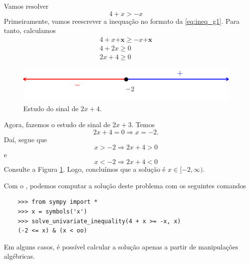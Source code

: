 \begin{ex}
  Vamos resolver
  \begin{equation}
    4 + x > -x
  \end{equation}
  Primeiramente, vamos reescrever a inequação no formato da \eqref{eq:ineq_g1}. Para tanto, calculamos
  \begin{gather}
    4 + x \pmb{+ x} \geq - x \pmb{ + x}\\
    4 + 2x \geq 0\\
    2x + 4 \geq 0
  \end{gather}

\begin{figure}[H]
  \centering
  \includegraphics{./cap_ineq/dados/fig_ex_ineq_g1ap/fig}
  \caption{Estudo do sinal de $2x + 4$.}
  \label{fig:ex_ineq_g1ap}
\end{figure}  
  
  Agora, fazemos o estudo de sinal de $2x + 3$. Temos
  \begin{equation}
    2x + 4 = 0 \Rightarrow x = -2.
  \end{equation}
  Daí, segue que
  \begin{equation}
    x > -2 \Rightarrow 2x + 4 > 0
  \end{equation}
  e
  \begin{equation}
    x < -2 \Rightarrow 2x + 4 < 0
  \end{equation}
  Consulte a Figura \ref{fig:ex_ineq_g1ap}. Logo, concluímos que a solução é $x\in [-2, \infty)$.

  \ifispython
  Com o {\sympy}, podemos computar a solução deste problema com os seguintes comandos
  \begin{lstlisting}
    >>> from sympy import *
    >>> x = symbols('x')
    >>> solve_univariate_inequality(4 + x >= -x, x)
    (-2 <= x) & (x < oo)
  \end{lstlisting}
  \fi
\end{ex}

Em alguns casos, é possível calcular a solução apenas a partir de manipulações algébricas.

